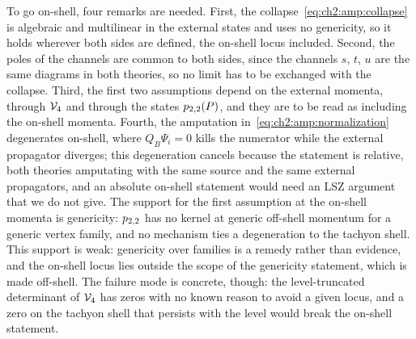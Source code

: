To go on-shell, four remarks are needed.
First, the collapse~\eqref{eq:ch2:amp:collapse} is algebraic and multilinear in the external states and uses no genericity, so it holds wherever both sides are defined, the on-shell locus included.
Second, the poles of the channels are common to both sides, since the channels $s$, $t$, $u$ are the same diagrams in both theories, so no limit has to be exchanged with the collapse.
Third, the first two assumptions depend on the external momenta, through $\mathcal{V}_{4}$ and through the states $p_{2,2}(P)$, and they are to be read as including the on-shell momenta.
Fourth, the amputation in~\eqref{eq:ch2:amp:normalization} degenerates on-shell, where $Q_B \Psi_i = 0$ kills the numerator while the external propagator diverges; this degeneration cancels because the statement is relative, both theories amputating with the same source and the same external propagators, and an absolute on-shell statement would need an LSZ argument that we do not give.
The support for the first assumption at the on-shell momenta is genericity: $p_{2,2}$ has no kernel at generic off-shell momentum for a generic vertex family, and no mechanism ties a degeneration to the tachyon shell.
This support is weak: genericity over families is a remedy rather than evidence, and the on-shell locus lies outside the scope of the genericity statement, which is made off-shell.
The failure mode is concrete, though: the level-truncated determinant of $\mathcal{V}_{4}$ has zeros with no known reason to avoid a given locus, and a zero on the tachyon shell that persists with the level would break the on-shell statement.

